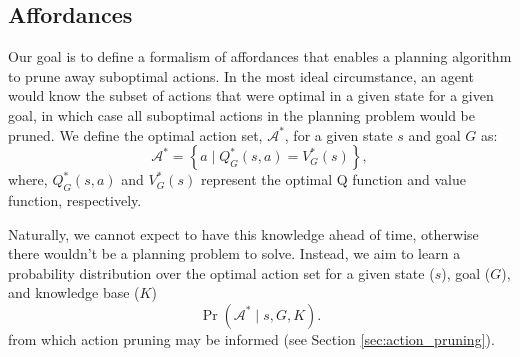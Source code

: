 \documentclass[conference]{IEEEtran}
\begin{document}


\subsection{Affordances}


Our goal is to define a formalism of affordances that enables a planning algorithm
to prune away suboptimal actions. In the most ideal circumstance, an agent would
know the subset of actions that were optimal in a given state for a given goal, in 
which case all suboptimal actions in the planning problem would be pruned. 
We define the optimal action set, $\mathcal{A}^*$, for a given state $s$ and goal $G$ as:
\begin{equation}
\mathcal{A}^* = \left\{ a \mid Q^*_G(s,a) = V^*_G(s) \right\}, 
\label{eq:opt_act_set}
\end{equation}
where, $Q^*_G(s,a)$ and $V^*_G(s)$ represent the optimal Q function and 
value function, respectively. 

Naturally, we cannot expect to have this knowledge ahead of time, otherwise there wouldn't be a planning problem to solve. Instead, we aim to learn a probability distribution over the optimal action set for a given state ($s$), goal ($G$), and knowledge base ($K$)
\begin{equation}
\Pr(\mathcal{A}^* \mid s, G, K).
\label{eq:master}
\end{equation}
from which action pruning may be informed (see Section \ref{sec:action_pruning}).
\end{document}
